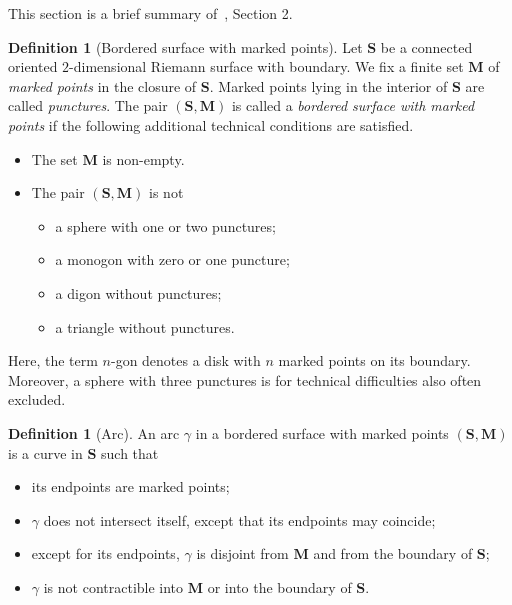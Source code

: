 \documentclass[a4paper,oneside,svgnames,draft]{amsart}
\theoremstyle{plain}
\theoremstyle{definition}
\newtheorem{definition}[theorem]{Definition}
\begin{document}
 This section is a brief summary of~\cite{fst}, Section 2.
 \begin{definition}[Bordered surface with marked points]
  \label{def:marked-surface}
  Let $\mathbf{S}$ be a connected oriented $2$-dimensional Riemann surface with
  boundary. We fix a finite set $\mathbf{M}$ of \emph{marked points} in the
  closure of $\mathbf{S}$. Marked points lying in the interior of $\mathbf{S}$
  are called \emph{punctures}. The pair $(\mathbf{S},\mathbf{M})$ is called a
  \emph{bordered surface with marked points} if the following additional
  technical conditions are satisfied.
  \begin{itemize}
   \item The set $\mathbf{M}$ is non-empty.
   \item The pair $(\mathbf{S}, \mathbf{M})$ is not
   \begin{itemize}
    \item a sphere with one or two punctures;
    \item a monogon with zero or one puncture;
    \item a digon without punctures;
    \item a triangle without punctures.
   \end{itemize}
  \end{itemize}
  Here, the term $n$-gon denotes a disk with $n$ marked points on its boundary.
  Moreover, a sphere with three punctures is for technical difficulties also
  often excluded.
 \end{definition}

 \begin{definition}[Arc]
  \label{def:arc}
  An arc $\gamma$ in a bordered surface with marked points
  $(\mathbf{S},\mathbf{M})$ is a curve in $\mathbf{S}$ such that
  \begin{itemize}
   \item its endpoints are marked points;
   \item $\gamma$ does not intersect itself, except that its endpoints may
    coincide;
   \item except for its endpoints, $\gamma$ is disjoint from $\mathbf{M}$ and
    from the boundary of $\mathbf{S}$;
   \item $\gamma$ is not contractible into $\mathbf{M}$ or into the boundary of
    $\mathbf{S}$.
  \end{itemize}
 \end{definition}
\end{document}
